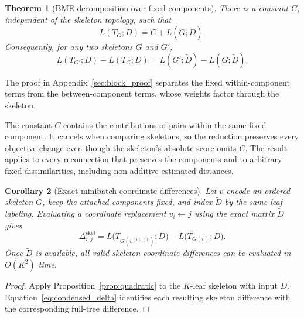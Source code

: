 \documentclass[11pt,a4paper]{article}
\makeatletter
\DeclareRobustCommand{\_}{\ifmmode\nfss@text{\textunderscore}\else\textunderscore\allowbreak\fi}
\newtheorem{theorem}{Theorem}[section]
\newtheorem{corollary}[theorem]{Corollary}
\theoremstyle{definition}
\makeatother
\begin{document}
\begin{theorem}[BME decomposition over fixed components]
\label{thm:clade_condense}
There is a constant $C$, independent of the skeleton topology, such that
\begin{equation}
 L(T_G;D)=C+L(G;\widetilde D).
 \label{eq:bme_condense_decomp}
\end{equation}
Consequently, for any two skeletons $G$ and $G'$,
\begin{equation}
 L(T_{G'};D)-L(T_G;D)
 =L(G';\widetilde D)-L(G;\widetilde D).
 \label{eq:condensed_delta}
\end{equation}
\end{theorem}
The proof in Appendix~\ref{sec:block_proof} separates the fixed within-component terms from the between-component terms, whose weights factor through the skeleton.

The constant $C$ contains the contributions of pairs within the same fixed component.
It cancels when comparing skeletons, so the reduction preserves every objective change even though the skeleton's absolute score omits $C$.
The result applies to every reconnection that preserves the components and to arbitrary fixed dissimilarities, including non-additive estimated distances.

\begin{corollary}[Exact minibatch coordinate differences]
\label{cor:minibatch_gradient}
Let $v$ encode an ordered skeleton $G$, keep the attached components fixed, and index $\widetilde D$ by the same leaf labeling.
Evaluating a coordinate replacement $v_i\leftarrow j$ using the exact matrix $\widetilde D$ gives
\begin{equation}
 \Delta^{\mathrm{skel}}_{i,j}
 =L\bigl(T_{G(v^{(i\leftarrow j)})};D\bigr)
  -L\bigl(T_{G(v)};D\bigr).
 \label{eq:minibatch_gradient}
\end{equation}
Once $\widetilde D$ is available, all valid skeleton coordinate differences can be evaluated in $O(K^2)$ time.
\end{corollary}
\begin{proof}
Apply Proposition~\ref{prop:quadratic} to the $K$-leaf skeleton with input $\widetilde D$.
Equation~\eqref{eq:condensed_delta} identifies each resulting skeleton difference with the corresponding full-tree difference.
\end{proof}
\end{document}
